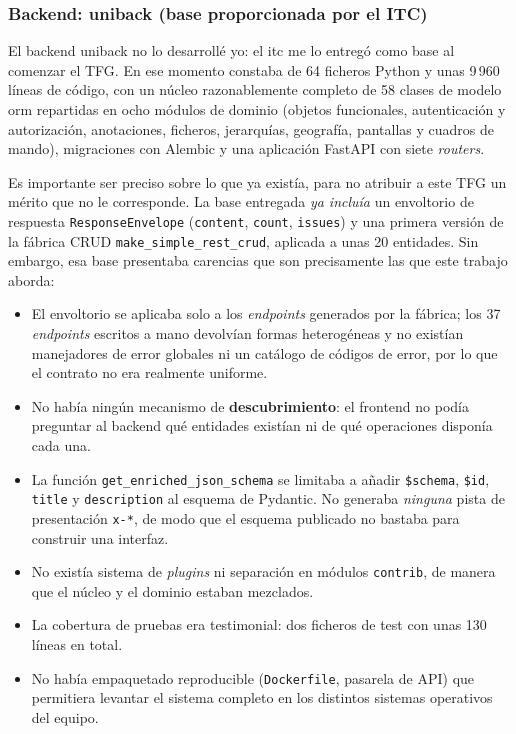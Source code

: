\subsubsection{Backend: uniback (base proporcionada por el ITC)}
El backend \gls{uniback} no lo desarrollé yo: el \gls{itc} me lo entregó como
base al comenzar el TFG. En ese momento constaba de 64 ficheros Python y unas
9\,960 líneas de código, con un núcleo razonablemente completo de 58 clases de
modelo \gls{orm} repartidas en ocho módulos de dominio (objetos funcionales,
autenticación y autorización, anotaciones, ficheros, jerarquías, geografía,
pantallas y cuadros de mando), migraciones con Alembic y una aplicación
FastAPI con siete \emph{routers}.

Es importante ser preciso sobre lo que ya existía, para no atribuir a este TFG
un mérito que no le corresponde. La base entregada \emph{ya incluía} un
envoltorio de respuesta \texttt{Response\allowbreak Envelope}
(\texttt{content}, \texttt{count}, \texttt{issues}) y una primera versión de la
fábrica CRUD \texttt{make\_simple\_rest\_crud}, aplicada a unas 20 entidades.
Sin embargo, esa base presentaba carencias que son precisamente las que este
trabajo aborda:

\begin{itemize}
  \item El envoltorio se aplicaba solo a los \emph{endpoints} generados por la
  fábrica; los 37 \emph{endpoints} escritos a mano devolvían formas
  heterogéneas y no existían manejadores de error globales ni un catálogo de
  códigos de error, por lo que el contrato no era realmente uniforme.
  \item No había ningún mecanismo de \textbf{descubrimiento}: el frontend no
  podía preguntar al backend qué entidades existían ni de qué operaciones
  disponía cada una.
  \item La función \texttt{get\_enriched\_json\_schema} se limitaba a añadir
  \texttt{\$schema}, \texttt{\$id}, \texttt{title} y \texttt{description} al
  esquema de Pydantic. No generaba \emph{ninguna} pista de presentación
  \texttt{x-*}, de modo que el esquema publicado no bastaba para construir una
  interfaz.
  \item No existía sistema de \emph{plugins} ni separación en módulos
  \texttt{contrib}, de manera que el núcleo y el dominio estaban mezclados.
  \item La cobertura de pruebas era testimonial: dos ficheros de test con unas
  130 líneas en total.
  \item No había empaquetado reproducible (\texttt{Dockerfile}, pasarela de
  API) que permitiera levantar el sistema completo en los distintos sistemas
  operativos del equipo.
\end{itemize}

